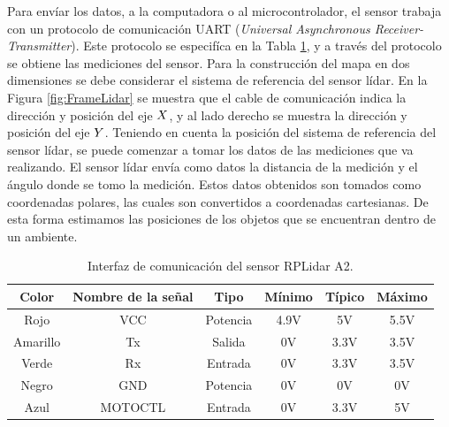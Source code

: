 Para envíar los datos, a la computadora o al microcontrolador, el sensor trabaja con un 
protocolo de comunicación UART (\textit{Universal Asynchronous Receiver-Transmitter}). Este 
protocolo se especifíca en la Tabla \ref{tbl:comunicacion}, y a través del protocolo se 
obtiene las mediciones del sensor. Para la construcción del mapa en dos dimensiones se 
debe considerar el sistema de referencia del sensor lídar. En la Figura \ref{fig:FrameLidar} 
se muestra que el cable de comunicación indica la dirección y posición del eje $\mathnormal X$, y al 
lado derecho se muestra la dirección y posición del eje $\mathnormal Y$. Teniendo en cuenta la 
posición del sistema de referencia del sensor lídar, se puede comenzar a tomar los datos de 
las mediciones que va realizando. El sensor lídar envía como datos la distancia de la medición y 
el ángulo donde se tomo la medición. Estos datos obtenidos son tomados como coordenadas 
polares, las cuales son convertidos a coordenadas cartesianas. De esta forma estimamos las 
posiciones de los objetos que se encuentran dentro de un ambiente.


\begin{table}[htbp]
\begin{center}
\begin{tabular}{|c|c|c|c|c|c|}
	\hline
	Color & Nombre de la señal & Tipo & Mínimo & Típico & Máximo \\ 
	\hline \hline
	Rojo & VCC & Potencia & 4.9V & 5V & 5.5V \\ \hline
	Amarillo & Tx & Salida & 0V & 3.3V & 3.5V \\ \hline
	Verde & Rx & Entrada & 0V & 3.3V & 3.5V \\ \hline
	Negro & GND & Potencia & 0V & 0V & 0V \\ \hline
	Azul & MOTOCTL & Entrada & 0V & 3.3V & 5V \\ \hline
\end{tabular}
	\caption{Interfaz de comunicación del sensor RPLidar A2.}
	\label{tbl:comunicacion}
\end{center}
\end{table}


